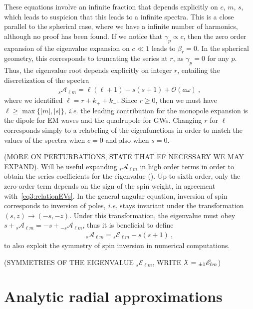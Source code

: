 These equations involve an infinite fraction that depends explicitly on $c$, $m$, $s$, which leads to suspicion that this leads to a infinite spectra.
This is a close parallel to the spherical case, where we have a infinite number of harmonics, although no proof has been found.
If we notice that $\gamma_p\propto c$, then the zero order expansion of the eigenvalue expansion on $c\ll 1$ leads to $\beta_r=0$.
In the spherical geometry, this corresponds to truncating the series at $r$, as $\gamma_p=0$ for any $p$. Thus, the eigenvalue root depends explicitly on integer $r$, entailing the discretization of the spectra
\begin{align}
    \label{eq3:evSWSH0th}
    {}_{s}\mathscr{A}_{\ell m} = \ell(\ell+1) - s(s+1) + \mathscr{O}(a\omega)~,
\end{align}
where we identified $\ell=r+k_{+}+k_{-}$.
Since $r\ge 0$, then we must have $\ell\ge\max\{|m|,|s|\}$, \emph{i.e.} the leading contribution for the monopole expansion is the dipole for EM waves and the quadrupole for GWs. 
Changing $r$ for $\ell$ corresponds simply to a relabeling of the eigenfunctions in order to match the values of the spectra when $c=0$ and also when $s=0$.

(MORE ON PERTURBATIONS, STATE THAT EF NECESSARY WE MAY EXPAND).
Will be useful expanding ${}_{s}\mathscr{A}_{\ell m}$ in high order terms in order to obtain the series coefficients for the eigenvalue ().
Up to sixth order, only the zero-order term depends on the sign of the spin weight, in agreement with~\eqref{eq3:relationEVs}.
In the general angular equation, inversion of spin corresponds to inversion of poles, \emph{i.e.} stays invariant under the transformation $(s,z)\to(-s,-z)$.
Under this transformation, the eigenvalue must obey $s+ {}_{s}\mathscr{A}_{\ell m} = -s + {}_{-s}\mathscr{A}_{\ell m}$, thus it is beneficial to define 
\begin{align}
    \label{eq3:sElm}
    {}_{s}\mathscr{A}_{\ell m} = {}_{s}\mathscr{E}_{\ell m} - s(s+1) ~,
\end{align}
to also exploit the symmetry of spin inversion in numerical computations.

(SYMMETRIES OF THE EIGENVALUE ${}_{s}\mathscr{E}_{\ell m}$, WRITE $\lambdabar={}_{\pm1}\mathscr{E}_{\ell m}$)


\section{Analytic radial approximations}

